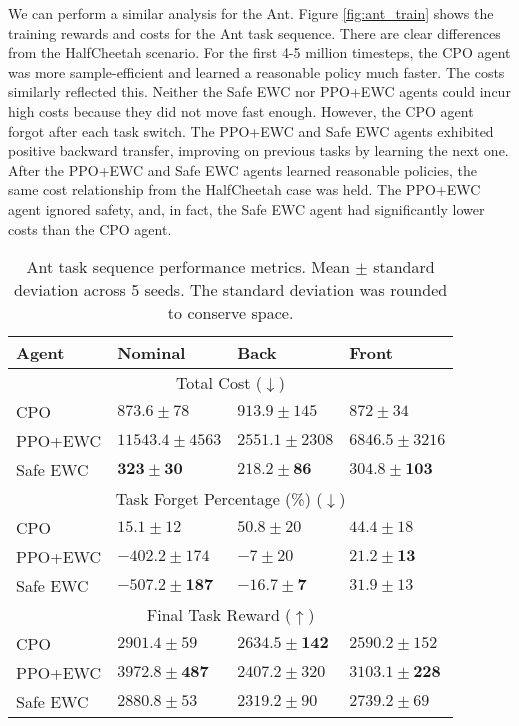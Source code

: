 We can perform a similar analysis for the Ant. Figure \ref{fig:ant_train} shows the training rewards and costs for the Ant task sequence. There are clear differences from the HalfCheetah scenario. For the first 4-5 million timesteps, the CPO agent was more sample-efficient and learned a reasonable policy much faster. The costs similarly reflected this. Neither the Safe EWC nor PPO+EWC agents could incur high costs because they did not move fast enough. However, the CPO agent forgot after each task switch. The PPO+EWC and Safe EWC agents exhibited positive backward transfer, improving on previous tasks by learning the next one. After the PPO+EWC and Safe EWC agents learned reasonable policies, the same cost relationship from the HalfCheetah case was held. The PPO+EWC agent ignored safety, and, in fact, the Safe EWC agent had significantly lower costs than the CPO agent. 

\begin{table}[t]
\caption{Ant task sequence performance metrics. Mean $\pm$ standard deviation across 5 seeds. The standard deviation was rounded to conserve space.}
\centering
\label{tab:ant}
\begin{tabular}{@{}llll@{}}
\toprule
Agent & Nominal            & Back             & Front          \\ \midrule
\multicolumn{4}{c}{Total Cost ($\downarrow$)}                                           \\ \midrule
CPO       & $873.6 \pm 78$     & $913.9 \pm 145$  & $872 \pm 34$ \\
PPO+EWC   & $11543.4 \pm 4563$ & $2551.1 \pm 2308$ & $6846.5 \pm 3216$ \\
Safe EWC  & $\mathbf{323 \pm 30}$     & $\mathbf{218.2 \pm 86}$  & $\mathbf{304.8 \pm 103}$  \\ \midrule
\multicolumn{4}{c}{Task Forget Percentage (\%) ($\downarrow$)}                                     \\ \midrule
CPO       & $15.1 \pm 12$      & $50.8 \pm 20$    & $44.4 \pm 18$  \\
PPO+EWC   & $-402.2 \pm 174$      & $-7 \pm 20$    & $\mathbf{21.2 \pm 13}$  \\
Safe EWC  & $\mathbf{-507.2 \pm 187}$      & $\mathbf{-16.7 \pm 7}$    & $31.9 \pm 13$  \\ \midrule
\multicolumn{4}{c}{Final Task Reward ($\uparrow$)}                                           \\ \midrule
CPO       & $2901.4 \pm 59$     & $\mathbf{2634.5 \pm 142}$  & $2590.2 \pm 152$ \\
PPO+EWC   & $\mathbf{3972.8 \pm 487}$ & $2407.2 \pm 320$ & $\mathbf{3103.1 \pm 228}$ \\
Safe EWC  & $2880.8 \pm 53$     & $2319.2 \pm 90$  & $2739.2 \pm 69$  \\ \bottomrule
\end{tabular}
\end{table}

